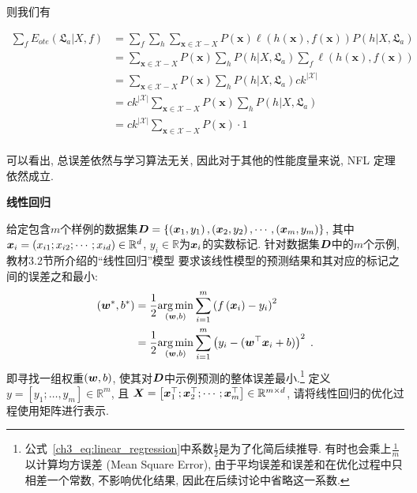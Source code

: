 \documentclass[answers]{exam}  %
\begin{document}
\begin{questions}
\begin{solution}
\begin{enumerate}
            则我们有

            $$
              \begin{aligned}
                \sum_{f}E_{ote}(\mathfrak{L}_{a}|X,f)
                 & =\sum_{f}\sum_{h}\sum_{\bm{x}\in \mathcal{X}-X}P(\bm{x})\ell(h(\bm{x}), f(\bm{x}))P(h|X,\mathfrak{L}_{a}) \\
                 & =\sum_{\bm{x}\in \mathcal{X}-X}P(\bm{x})\sum_{h}P(h|X,\mathfrak{L}_{a})\sum_{f}\ell(h(\bm{x}), f(\bm{x})) \\
                 & =\sum_{\bm{x}\in \mathcal{X}-X}P(\bm{x})\sum_{h}P(h|X,\mathfrak{L}_{a})ck^{|\mathcal{X}|}                 \\
                 & =ck^{|\mathcal{X}|}\sum_{\bm{x}\in \mathcal{X}-X}P(\bm{x})\sum_{h}P(h|X,\mathfrak{L}_{a})                 \\
                 & =ck^{|\mathcal{X}|}\sum_{\bm{x}\in \mathcal{X}-X}P(\bm{x})\cdot 1                                         \\
              \end{aligned}
            $$

            可以看出, 总误差依然与学习算法无关, 因此对于其他的性能度量来说, NFL 定理依然成立.
    \end{enumerate}
  \end{solution}


  \question [15] \textbf{线性回归}

  给定包含$m$个样例的数据集$\boldsymbol{D}=\left\{\left({\boldsymbol{x}}_{1}, y_{1}\right),\left({\boldsymbol{x}}_{2}, y_{2}\right), \cdots,\left({\boldsymbol{x}}_{m}, y_{m}\right)\right\}$, 其中${\boldsymbol{x}}_{i}=\left(x_{i 1} ; x_{i 2} ; \cdots ; x_{i d}\right) \in \mathbb{R}^{d}$, $y_{i} \in\mathbb{R}$为${\boldsymbol{x}}_{i}$的实数标记.
  针对数据集$\boldsymbol{D}$中的$m$个示例, 教材3.2节所介绍的“线性回归”模型 要求该线性模型的预测结果和其对应的标记之间的误差之和最小:
  \begin{align}
    \left(\boldsymbol{w}^{*}, b^{*}\right) & =\frac{1}{2}\underset{(\boldsymbol{w}, b)}{\arg \min } \sum_{i=1}^{m}\left(f\left({\boldsymbol{x}}_{i}\right)-y_{i}\right)^{2} \notag                            \\
                                & =\frac{1}{2}\underset{(\boldsymbol{w}, b)}{\arg \min } \sum_{i=1}^{m}\left(y_{i}-(\boldsymbol{w}^\top {\boldsymbol{x}}_{i}+b)\right)^{2}\;.\label{ch3_eq:linear_regression}
  \end{align}
  即寻找一组权重$(\boldsymbol{w}, b)$, 使其对$\boldsymbol{D}$中示例预测的整体误差最小.\footnote{公式~\ref{ch3_eq:linear_regression}中系数$\frac{1}{2}$是为了化简后续推导. 有时也会乘上$\frac{1}{m}$以计算均方误差 (Mean Square Error), 由于平均误差和误差和在优化过程中只相差一个常数, 不影响优化结果, 因此在后续讨论中省略这一系数.}
  定义$y=\left[y_{1}; \ldots, y_{m}\right] \in \mathbb{R}^{m}$, 且 $\boldsymbol{X}=\left[{\boldsymbol{x}}_{1}^\top ; {\boldsymbol{x}}_{2}^\top ; \cdots ; {\boldsymbol{x}}_{m}^\top\right] \in \mathbb{R}^{m \times d}$, 请将线性回归的优化过程使用矩阵进行表示.


\end{questions}
\end{document}

